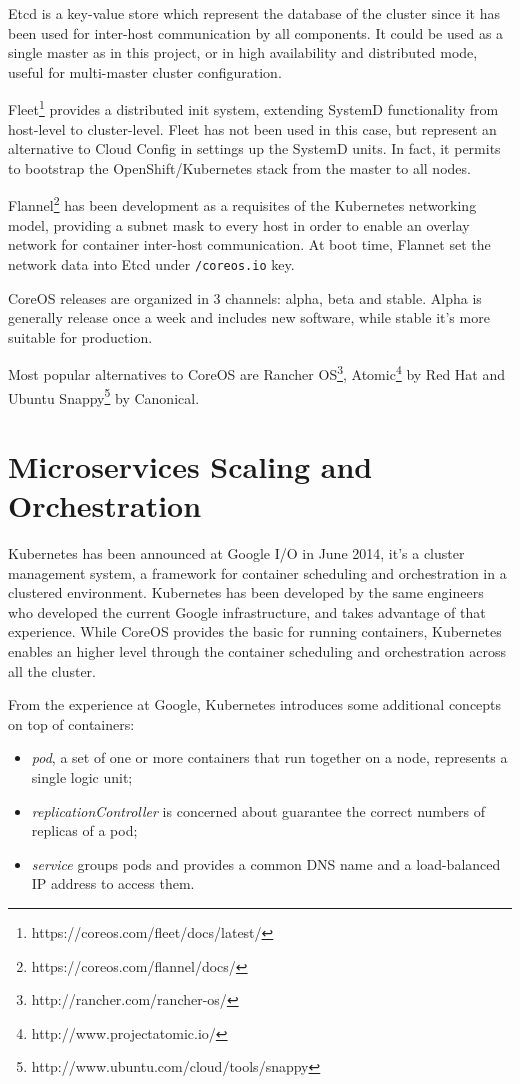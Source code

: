 Etcd is a key-value store which represent the database of the cluster since it has been used for inter-host communication by all components.  It could be used as a single master as in this project, or in high availability and distributed mode, useful for multi-master cluster configuration.

Fleet\footnote{https://coreos.com/fleet/docs/latest/} provides a distributed init system, extending SystemD functionality from host-level to cluster-level.  Fleet has not been used in this case, but represent an alternative to Cloud Config in settings up the SystemD units.  In fact, it permits to bootstrap the OpenShift/Kubernetes stack from the master to all nodes.

Flannel\footnote{https://coreos.com/flannel/docs/} has been development as a requisites of the Kubernetes networking model, providing a subnet mask to every host in order to enable an overlay network for container inter-host communication.  At boot time, Flannet set the network data into Etcd under \texttt{/coreos.io} key.

CoreOS releases are organized in 3 channels: alpha, beta and stable. Alpha is generally release once a week and includes new software, while stable it's more suitable for production.

Most popular alternatives to CoreOS are Rancher OS\footnote{http://rancher.com/rancher-os/}, Atomic\footnote{http://www.projectatomic.io/} by Red Hat and Ubuntu Snappy\footnote{http://www.ubuntu.com/cloud/tools/snappy} by Canonical.

\section{Microservices Scaling and Orchestration}\label{microservices-scaling-and-orchestration}

Kubernetes has been announced at Google I/O in June 2014, it's a cluster management system, a framework for container scheduling and orchestration in a clustered environment. Kubernetes has been developed by the same engineers who developed the current Google infrastructure, and takes advantage of that experience.  While CoreOS provides the basic for running containers, Kubernetes enables an higher level through the container scheduling and orchestration across all the cluster.

From the experience at Google, Kubernetes introduces some additional concepts on top of containers:
\begin{itemize}
\item \textit{pod}, a set of one or more containers that run together on a node, represents a single logic unit;
\item \textit{replicationController} is concerned about guarantee the correct numbers of replicas of a pod;
\item \textit{service} groups pods and provides a common DNS name and a load-balanced IP address to access them.
\end{itemize}

